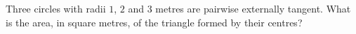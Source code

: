 Three circles with radii $1$, $2$ and $3$ metres are pairwise externally tangent. What is the area, in square metres, of the triangle formed by their centres?
